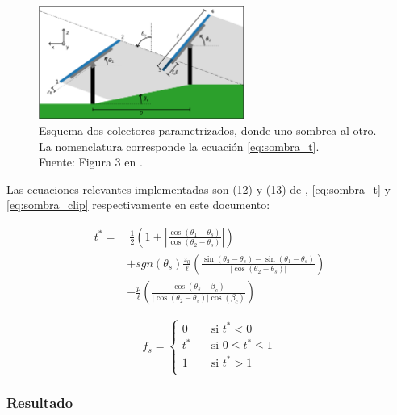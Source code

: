 \begin{figure}[H]
    \centering
    \includegraphics[width=0.6\textwidth]{./images/shading_1d/Anderson_Jensen_Fig3.png}
    \caption{Esquema dos colectores parametrizados, donde uno sombrea al otro. La nomenclatura corresponde la ecuación \ref{eq:sombra_t}.\\Fuente: Figura 3 en \cite{Anderson_Jensen_2024}.}
    \label{fig:fraccion_sombra}
\end{figure}

Las ecuaciones relevantes implementadas son (12) y (13) de \cite{Anderson_Jensen_2024}, \ref{eq:sombra_t} y \ref{eq:sombra_clip} respectivamente en este documento:

\begin{equation} \label{eq:sombra_t}
    \begin{aligned}
        t^* = & \ \frac{1}{2} \left( 1 + \left|\frac{\cos(\theta_1 - \theta_s)}{\cos(\theta_2 - \theta_s)}\right| \right)                                            \\
              & + sgn(\theta_s) \frac{z_0}{\ell} \left( \frac{\sin(\theta_2 - \theta_s) - \sin(\theta_1 - \theta_s)}{\left|\cos(\theta_2 - \theta_s)\right|} \right) \\
              & - \frac{p}{\ell} \left( \frac{\cos(\theta_s - \beta_c)}{\left|\cos(\theta_2 - \theta_s)\right| \cos(\beta_c)} \right)
    \end{aligned}
\end{equation}

\begin{equation} \label{eq:sombra_clip}
    f_s =
    \begin{cases}
        0   & \quad \text{si } t^* < 0 \\
        t^* & \quad \text{si } 0 \leq t^* \leq 1  \\
        1   & \quad \text{si } t^* > 1 \\
    \end{cases}
\end{equation}

\subsubsection{Resultado}

